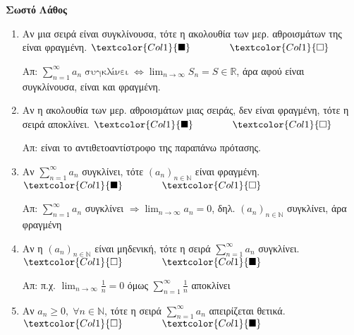 \documentclass[a4paper,table]{report}
\begin{document}
\begin{center}
  \minibox{\large\bfseries \textcolor{Col2}{Σειρές (Ερωτήσεις)}}
\end{center}


\vspace{\baselineskip}

\hfill \textcolor{Col1}{\textbf{Σωστό}} \quad \textcolor{Col1}{\textbf{Λάθος}}
\begin{enumerate}[itemsep=.5\baselineskip]
  \item \textcolor{Col1}{Αν μια σειρά είναι συγκλίνουσα, τότε η ακολουθία των μερ.
    αθροισμάτων της είναι φραγμένη}. 
    \hfill $\textcolor{Col1}{\blacksquare} \qquad \qquad \textcolor{Col1}{\square}$

    Απ: $ \sum_{n=1}^{\infty} a_{n} \; \text{συγκλίνει} \; \Leftrightarrow \lim_{n \to
    \infty} S_{n} = S \in \mathbb{R} $, άρα αφού είναι συγκλίνουσα, είναι και φραγμένη. 

  \item \textcolor{Col1}{Αν η ακολουθία των μερ. αθροισμάτων μιας σειράς, δεν είναι
    φραγμένη, τότε η σειρά αποκλίνει}.
    \hfill $\textcolor{Col1}{\blacksquare} \qquad \qquad \textcolor{Col1}{\square}$

    Απ: είναι το αντιθετοαντίστροφο της παραπάνω πρότασης.

  \item \textcolor{Col1}{Αν $ \sum_{n=1}^{\infty} a_{n} $ συγκλίνει, τότε 
      $ {(a_{n})}_{n \in \mathbb{N}} $ είναι φραγμένη}.
    \hfill $\textcolor{Col1}{\blacksquare} \qquad \qquad \textcolor{Col1}{\square}$

    Απ: $ \sum_{n=1}^{\infty} a_{n} $ συγκλίνει $ \Rightarrow \lim_{n \to \infty} a_{n} =
    0 $, δηλ. $ {(a_{n})}_{n \in \mathbb{N}} $ συγκλίνει, άρα φραγμένη

  \item \textcolor{Col1}{Αν η $ {(a_{n})}_{n \in \mathbb{N}} $ είναι μηδενική, τότε η
    σειρά $ \sum_{n=1}^{\infty} a_{n} $ συγκλίνει}.
    \hfill $\textcolor{Col1}{\square} \qquad \qquad \textcolor{Col1}{\blacksquare}$

    Απ: π.χ. $ \lim_{n \to \infty} \frac{1}{n} = 0 $ όμως $ \sum_{n=1}^{\infty}
    \frac{1}{n} $ αποκλίνει 

  \item \textcolor{Col1}{Αν $ a_{n} \geq 0, \; \forall n \in
    \mathbb{N} $, τότε η σειρά $ \sum_{n=1}^{\infty} a_{n} $ απειρίζεται θετικά}.
    \hfill $\textcolor{Col1}{\square} \qquad \qquad \textcolor{Col1}{\blacksquare}$


\end{enumerate}
\end{document}
